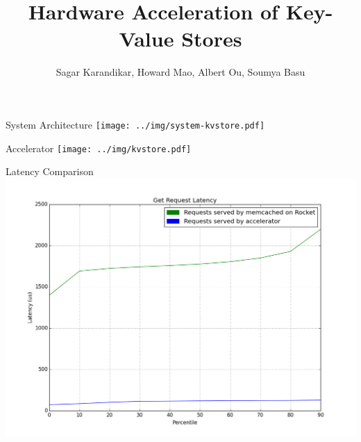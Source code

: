 \documentclass{beamer}
\title{Hardware Acceleration of Key-Value Stores}
\author{Sagar Karandikar, Howard Mao, Albert Ou, Soumya Basu}
\institute[UC Berkeley]{\textsc{University of California, Berkeley}}
\begin{document}
\frame{\titlepage}

\begin{frame}
    
\end{frame}

\begin{frame}{System Architecture}
    \texttt{[image: ../img/system-kvstore.pdf]}
\end{frame}

\begin{frame}{Accelerator}
    \texttt{[image: ../img/kvstore.pdf]}
\end{frame}

\begin{frame}{Latency Comparison}
    \includegraphics[width=\linewidth]{../img/graph.png}
\end{frame}

\begin{frame}
    
\end{frame}

\begin{frame}
\end{frame}
\end{document}
